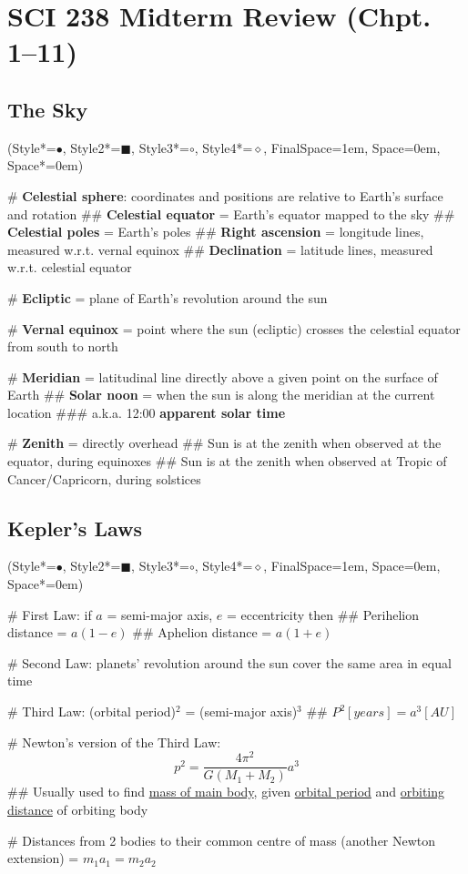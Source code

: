 \documentclass[11pt, oneside]{article}
\newcommand*{\begineasylist}{\begin{easylist}[itemize]\ListProperties(Style*=$\bullet$\quad, Style2*=\tiny$\blacksquare$\quad, Style3*=$\circ$\quad, Style4*=$\diamond$\quad, FinalSpace=1em, Space=0em, Space*=0em)}
\begin{document}
\section*{SCI 238 Midterm Review (Chpt. 1--11)}

\subsection*{The Sky}
\begineasylist

# \textbf{Celestial sphere}: coordinates and positions are relative to Earth's surface and rotation
## \textbf{Celestial equator} = Earth's equator mapped to the sky
## \textbf{Celestial poles} = Earth's poles
## \textbf{Right ascension} = longitude lines, measured w.r.t. vernal equinox
## \textbf{Declination} = latitude lines, measured w.r.t. celestial equator

# \textbf{Ecliptic} = plane of Earth's revolution around the sun

# \textbf{Vernal equinox} = point where the sun (ecliptic) crosses the celestial equator from south to north

# \textbf{Meridian} = latitudinal line directly above a given point on the surface of Earth
## \textbf{Solar noon} = when the sun is along the meridian at the current location
### a.k.a. 12:00 \textbf{apparent solar time}

# \textbf{Zenith} = directly overhead
## Sun is at the zenith when observed at the equator, during equinoxes
## Sun is at the zenith when observed at Tropic of Cancer/Capricorn, during solstices

\end{easylist}
\subsection*{Kepler's Laws}
\begineasylist

# First Law: if $a$ = semi-major axis, $e$ = eccentricity then
## Perihelion distance = $a(1 - e)$
## Aphelion distance = $a(1 + e)$

# Second Law: planets' revolution around the sun cover the same area in equal time

# Third Law: (orbital period)$^2$ = (semi-major axis)$^3$
## $P^2 [years] = a^3 [AU]$

# Newton's version of the Third Law:
\[ p^2 = \frac{4\pi^2}{G(M_1 + M_2)}a^3 \]
## Usually used to find \underline{mass of main body}, given \underline{orbital period} and \underline{orbiting distance} of orbiting body

# Distances from 2 bodies to their common centre of mass (another Newton extension) = $m_1a_1 = m_2a_2$


\end{easylist}
\end{document}
